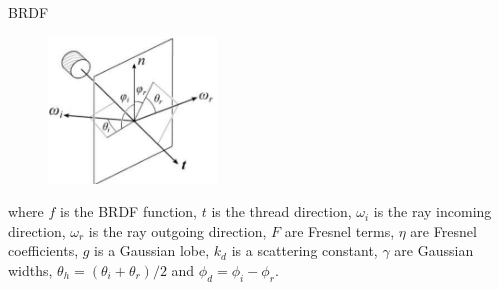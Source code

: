 \documentclass{beamer}
\begin{document}
\begin{frame}{BRDF}
\begin{multicols}{2}
\begin{figure}[b!]
\includegraphics[width=0.4\textwidth]{img/cloth_directions}
\end{figure}

\footnotesize{where $f$ is the BRDF function, $t$ is the thread direction, $\omega_i$ is the ray incoming direction, $\omega_r$ is the ray outgoing direction, $F$ are Fresnel terms, $\eta$ are Fresnel coefficients, $g$ is a Gaussian lobe, $k_d$ is a scattering constant, $\gamma$ are Gaussian widths, $\theta_h = (\theta_i+\theta_r)/2$ and $\phi_d = \phi_i-\phi_r$. }
\end{multicols}

\end{frame}
\end{document}
